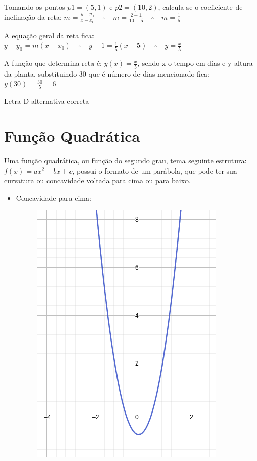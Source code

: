 \begin{multicols*}{2}
    Tomando os pontos $p1= (5,1)$  e $p2 = (10,2)$, calcula-se o coeficiente de inclinação da reta:
    $m = \frac{y - y_0}{x - x_0} \quad \therefore \quad m = \frac{2 - 1}{10 - 5}
        \quad \therefore \quad m = \frac{1}{5}$

    A equação geral da reta fica: $y - y_0 = m(x-x_0) \quad \therefore \quad
        y -1 =  \frac{1}{5} \left(x - 5 \right) \quad \therefore \quad y = \frac{x}{5}$

    A função que determina reta é: $y(x) = \frac{x}{5}$, sendo x o tempo em dias e y altura da 				planta, substituindo 30 que é número de dias mencionado fica: $y(30) = \frac{30}{5} = 6$

    Letra D alternativa correta

    \section*{Função Quadrática}
    Uma função quadrática, ou função do segundo grau, tema seguinte estrutura: $f(x) = ax^2 + bx 			+c$, possui o formato de um parábola, que pode ter sua curvatura ou concavidade voltada para 			cima ou para baixo.
    \begin{itemize}[wide, labelwidth=!, labelindent=0pt]
        \item Concavidade para cima:
              \begin{figure}[H]
                  \centering
                  \includegraphics[scale=0.3]{assets/rafael/img16.png}

\end{figure}
\end{itemize}
\end{multicols*}
